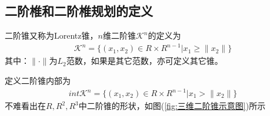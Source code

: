     \subsection{二阶椎和二阶椎规划的定义}
        \begin{definition}[二阶锥]
        二阶锥又称为Lorentz锥，$n$维二阶锥$\mathcal{K}^n$的定义为
        \begin{align*}
          \mathcal{K}^n=\{(x_1,x_2) \in R\times R^{n-1}|x_1 \geqslant \|x_2\|\}
        \end{align*}
        其中：$\|\cdot\|$为$L_2$范数，如果是其它范数，亦可定义其它锥。
        \end{definition}
        \par
        定义二阶锥内部为
        \begin{align*}
          {int}\mathcal{K}^n=\{(x_1,x_2) \in R\times R^{n-1}|x_1 > \|x_2\|\}
        \end{align*}
        不难看出在$R,R^2,R^3$中二阶锥的形状，如图(\ref{fig:三维二阶锥示意图})所示
